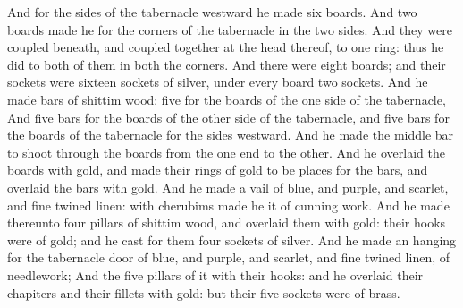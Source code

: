 \begin{biblechapter}
\verse And for the sides of the tabernacle westward he made six boards.
\verse And two boards made he for the corners of the tabernacle in the two sides.
\verse And they were coupled beneath, and coupled together at the head thereof, to one ring: thus he did to both of them in both the corners.
\verse And there were eight boards; and their sockets were sixteen sockets of silver, under every board two sockets.
\verse And he made bars of shittim wood; five for the boards of the one side of the tabernacle,
\verse And five bars for the boards of the other side of the tabernacle, and five bars for the boards of the tabernacle for the sides westward.
\verse And he made the middle bar to shoot through the boards from the one end to the other.
\verse And he overlaid the boards with gold, and made their rings of gold to be places for the bars, and overlaid the bars with gold.
\verse And he made a vail of blue, and purple, and scarlet, and fine twined linen: with cherubims made he it of cunning work.
\verse And he made thereunto four pillars of shittim wood, and overlaid them with gold: their hooks were of gold; and he cast for them four sockets of silver.
\verse And he made an hanging for the tabernacle door of blue, and purple, and scarlet, and fine twined linen, of needlework;
\verse And the five pillars of it with their hooks: and he overlaid their chapiters and their fillets with gold: but their five sockets were of brass.
\end{biblechapter}

